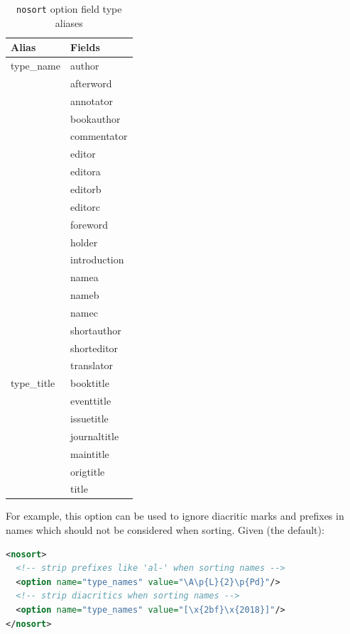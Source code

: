 \documentclass{ltxdockit}
\begin{document}
\begin{table}
\begin{center}
\small
\begin{tabular}{ll}
\toprule
Alias & Fields\\
\midrule
type\_name & author\\
          & afterword\\
          & annotator\\
          & bookauthor\\
          & commentator\\
          & editor\\
          & editora\\
          & editorb\\
          & editorc\\
          & foreword\\
          & holder\\
          & introduction\\
          & namea\\
          & nameb\\
          & namec\\
          & shortauthor\\
          & shorteditor\\
          & translator\\
type\_title & booktitle\\
           & eventtitle\\
           & issuetitle\\
           & journaltitle\\
           & maintitle\\
           & origtitle\\
           & title\\
\bottomrule
\end{tabular}
\end{center}
\caption{\texttt{nosort} option field type aliases}
\label{tab:nst}
\end{table}

For example, this option can be used to ignore diacritic marks and prefixes
in names which should not be considered when sorting. Given (the default):

\begin{lstlisting}[language=xml]
<nosort>
  <!-- strip prefixes like 'al-' when sorting names -->
  <option name="type_names" value="\A\p{L}{2}\p{Pd}"/>
  <!-- strip diacritics when sorting names -->
  <option name="type_names" value="[\x{2bf}\x{2018}]"/>
</nosort>
\end{lstlisting}
\end{document}

